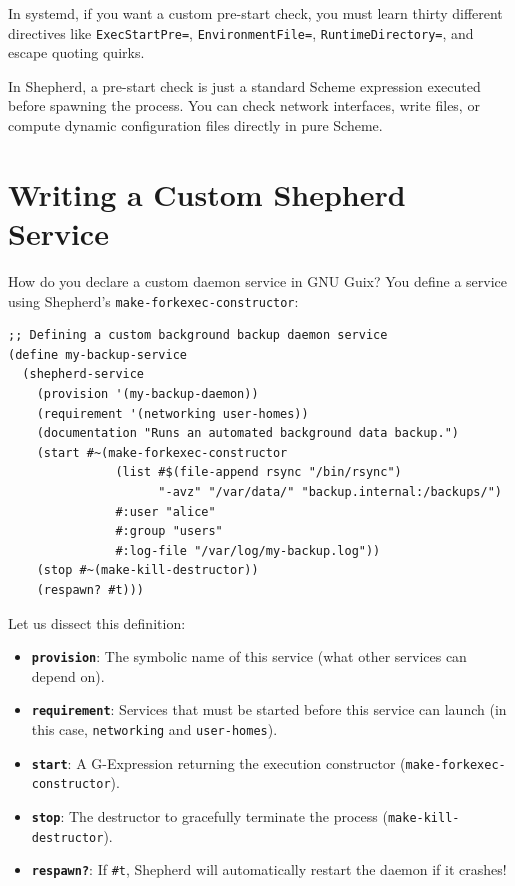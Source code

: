\begin{tearsbox}
In systemd, if you want a custom pre-start check, you must learn thirty different directives like \texttt{ExecStartPre=}, \texttt{EnvironmentFile=}, \texttt{RuntimeDirectory=}, and escape quoting quirks.

In Shepherd, a pre-start check is just a standard Scheme expression executed before spawning the process. You can check network interfaces, write files, or compute dynamic configuration files directly in pure Scheme.
\end{tearsbox}

\section{Writing a Custom Shepherd Service}

How do you declare a custom daemon service in GNU Guix? You define a service using Shepherd's \texttt{make-forkexec-constructor}:

\begin{lstlisting}[style=guixscheme]
;; Defining a custom background backup daemon service
(define my-backup-service
  (shepherd-service
    (provision '(my-backup-daemon))
    (requirement '(networking user-homes))
    (documentation "Runs an automated background data backup.")
    (start #~(make-forkexec-constructor
               (list #$(file-append rsync "/bin/rsync")
                     "-avz" "/var/data/" "backup.internal:/backups/")
               #:user "alice"
               #:group "users"
               #:log-file "/var/log/my-backup.log"))
    (stop #~(make-kill-destructor))
    (respawn? #t)))
\end{lstlisting}

Let us dissect this definition:
\begin{itemize}
  \item \textbf{\texttt{provision}}: The symbolic name of this service (what other services can depend on).
  \item \textbf{\texttt{requirement}}: Services that must be started before this service can launch (in this case, \texttt{networking} and \texttt{user-homes}).
  \item \textbf{\texttt{start}}: A G-Expression returning the execution constructor (\texttt{make-forkexec-constructor}).
  \item \textbf{\texttt{stop}}: The destructor to gracefully terminate the process (\texttt{make-kill-destructor}).
  \item \textbf{\texttt{respawn?}}: If \texttt{\#t}, Shepherd will automatically restart the daemon if it crashes!
\end{itemize}

